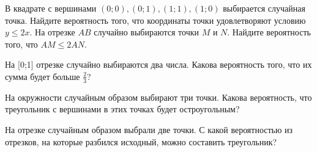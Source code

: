 \documentclass[a4paper,12pt]{article}
\begin{document}
   В квадрате с вершинами $(0;0), (0;1), (1;1), (1;0)$ выбирается случайная точка. Найдите вероятность того, что координаты точки удовлетворяют условию $y\le 2x$.  На отрезке $AB$ случайно выбираются точки $M$ и $N$. Найдите вероятность того, что $AM\le 2AN$.

  На [0;1] отрезке случайно выбираются два числа. Какова вероятность того, что их сумма будет больше $\frac{2}{3}$?

  На окружности случайным образом выбирают три точки. Какова вероятность, что треугольник с вершинами в этих точках будет остроугольным?

  На отрезке случайным образом выбрали две точки. С какой вероятностью из отрезков, на которые разбился исходный, можно составить треугольник?
















\end{document}
